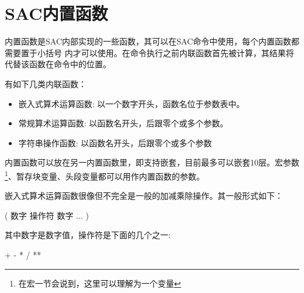 \section{SAC内置函数\protect\footnotemark}
内置函数是SAC内部实现的一些函数，其可以在SAC命令中使用，每个内置函数都需要置于小括号
内才可以使用。在命令执行之前内联函数首先被计算，其结果将代替该函数在命令中的位置。

有如下几类内联函数：
\begin{itemize}
\renewcommand\labelitemi{\dag}	%
\item 嵌入式算术运算函数: 以一个数字开头，函数名位于参数表中。
\item 常规算术运算函数: 以函数名开头，后跟零个或多个参数。
\item 字符串操作函数: 以函数名开头，后跟零个或多个参数
\end{itemize}
内置函数可以放在另一内置函数里，即支持嵌套，目前最多可以嵌套10层。宏参数
\footnote{在宏一节会说到，这里可以理解为一个变量}、暂存块变量、头段变量都可以用作内置函数的参数。

嵌入式算术运算函数很像但不完全是一般的加减乘除操作。其一般形式如下：
\begin{SACCode}
       ( 数字 操作符 数字 ... ) 
\end{SACCode}
其中数字是数字值，操作符是下面的几个之一:
\begin{SACCode}
       +  -  *  /  ** 
\end{SACCode}

